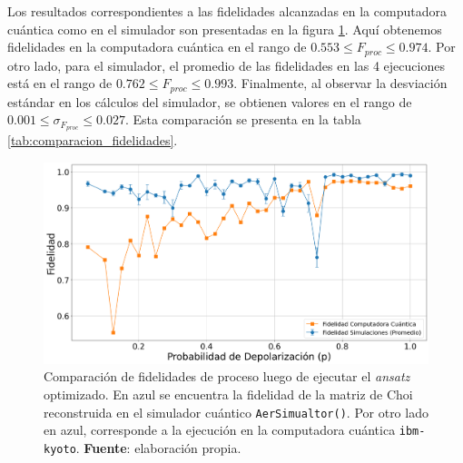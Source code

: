 \documentclass[letterpaper,12pt]{thesisECFM}
\theoremstyle{plain}
\theoremstyle{definition}
\theoremstyle{definition}
\theoremstyle{remark}
\newcommand{\1}{\mathbb{1}}
\begin{document}
Los resultados correspondientes a las fidelidades alcanzadas en la computadora
cuántica como en el simulador son presentadas en la figura
\ref{fig:comparacion_fidelidad}. Aquí obtenemos fidelidades en la computadora
cuántica en el rango de $0.553\leq F_{proc} \leq 0.974$. Por otro lado, para el
simulador, el promedio de las fidelidades en las 4 ejecuciones está en el rango
de $0.762\leq F_{proc} \leq 0.993$. Finalmente, al observar la desviación
estándar en los cálculos del simulador, se obtienen valores en el rango de
$0.001\leq \sigma_{F_{proc}} \leq 0.027$. Esta comparación se presenta en la
tabla \ref{tab:comparacion_fidelidades}.



\begin{figure}[h!] 
    \centering 
    \includegraphics[width=0.7\linewidth]{imagenes/comparacion fidelidad.png}
    \caption{Comparación de fidelidades de proceso luego de ejecutar el \textit{ansatz}
optimizado. En azul se encuentra la fidelidad de la matriz de Choi reconstruida
en el simulador cuántico \texttt{AerSimualtor()}. Por otro lado en azul,
corresponde a la ejecución en la computadora cuántica \texttt{ibm-kyoto}.
\textbf{Fuente}: elaboración propia. }
    \label{fig:comparacion_fidelidad}
    \end{figure}
    

\begin{table}[htbp]
\centering 
{}
\caption{Comparación de fidelidad de proceso entre las matrices de Choi
reconstruidas del \textit{ansatz} optimizado. Los resultados de la computadora cuántica
fueron tomados en \texttt{ibm-kyoto}, mientras que en el simulador fueron en
\texttt{AerSimualtor()} de Qiskit. \textbf{Fuente:} elaboración propia.}
\label{tab:comparacion_fidelidades}
\end{table}
\end{document}
